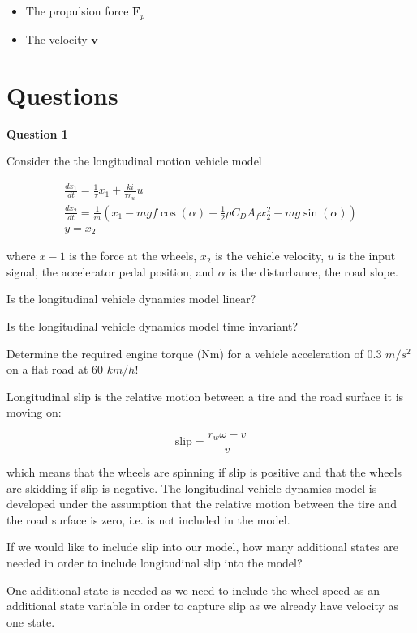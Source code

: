 \begin{itemize}
\item The propulsion force $\mathbf{F}_p$  
\item The velocity $\mathbf{v}$
\end{itemize}


\section{Questions}

\textbf{Question 1}

Consider the the longitudinal motion vehicle model

\begin{eqnarray}
\frac{dx_1}{dt} = \frac{1}{\tau}x_1 + \frac{ki}{\tau r_w} u \nonumber \\
\frac{dx_2}{dt} = \frac{1}{m} \left ( x_1 - mgf\cos(\alpha) - \frac{1}{2}\rho C_DA_f x_{2}^2 - mg\sin(\alpha) \right )  \nonumber \\
y = x_2 \nonumber
\end{eqnarray}

where  $x-1$ is the force at the wheels, $x_2$ is the vehicle velocity, $u$ is the input signal, the accelerator pedal position, and $\alpha$ is the disturbance, the road slope.

Is the longitudinal vehicle dynamics model linear?

Is the longitudinal vehicle dynamics model time invariant?

Determine the required engine torque (Nm) for a vehicle acceleration of 0.3 $m/s^2$ on a flat road at 60 $km/h$!


Longitudinal slip is the relative motion between a tire and the road surface it is moving on: 

\begin{equation}
\text{slip} = \frac{r_w \omega - v}{v}
\end{equation}

which means that the wheels are spinning if slip is positive and that the wheels are skidding if slip is negative. The longitudinal vehicle dynamics model is developed under the assumption that the relative motion between the tire and the road surface is zero, i.e. is not included in the model.

If we would like to include slip into our model, how many additional states are needed in order to include longitudinal slip into the model?


One additional state is needed as we need to include the wheel speed as an additional state variable in order to capture slip as we already have velocity as one state. 

